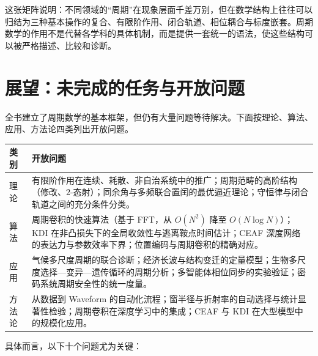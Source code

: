 这张矩阵说明：不同领域的“周期”在现象层面千差万别，但在数学结构上往往可以归结为三种基本操作的复合、有限阶作用、闭合轨道、相位耦合与标度嵌套。周期数学的作用不是代替各学科的具体机制，而是提供一套统一的语法，使这些结构可以被严格描述、比较和诊断。

\section{展望：未完成的任务与开放问题}

全书建立了周期数学的基本框架，但仍有大量问题等待解决。下面按理论、算法、应用、方法论四类列出开放问题。

\begin{center}
\renewcommand{\arraystretch}{1.3}
\small
\begin{tabular}{@{}p{2.2cm}p{10.5cm}@{}}
\toprule
\textbf{类别} & \textbf{开放问题} \\
\midrule
理论 & 有限阶作用在连续、耗散、非自治系统中的推广；周期范畴的高阶结构（修改、$2$-态射）；同余角与多频联合置闰的最优逼近理论；守恒律与闭合轨道之间的充分条件分类。 \\
算法 & 周期卷积的快速算法（基于 FFT，从 $O(N^2)$ 降至 $O(N\log N)$）；KDI 在非凸损失下的全局收敛性与逃离鞍点时间估计；CEAF 深度网络的表达力与参数效率下界；位置编码与周期卷积的精确对应。 \\
应用 & 气候多尺度周期的联合诊断；经济长波与结构变迁的定量模型；生物多尺度选择—变异—遗传循环的周期分析；多智能体相位同步的实验验证；密码系统周期安全性的统一度量。 \\
方法论 & 从数据到 Waveform 的自动化流程；窗半径与折射率的自动选择与统计显著性检验；周期卷积在深度学习中的集成；CEAF 与 KDI 在大型模型中的规模化应用。 \\
\bottomrule
\end{tabular}
\end{center}

具体而言，以下十个问题尤为关键：

